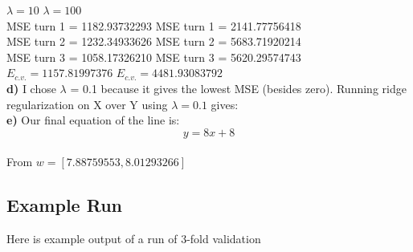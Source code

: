 \documentclass{article}
\begin{document}
 $\lambda = 10$  \hspace{20em}  $\lambda =100$ \\
MSE turn  1  =  1182.93732293  \hspace{10em} MSE turn  1  =  2141.77756418 \\
MSE turn  2  =  1232.34933626  \hspace{10em} MSE turn  2  =  5683.71920214 \\
MSE turn  3  =  1058.17326210  \hspace{10em} MSE turn  3  =  5620.29574743 \\
$E_{c.v.} =  1157.81997376$  \hspace{13em} $E_{c.v.} =  4481.93083792$ \\


\textbf{d)} I chose $\lambda$ = 0.1 because it gives the lowest MSE (besides zero). Running ridge regularization on X over Y using $\lambda = 0.1$ gives:  \\

\textbf{e)} Our final equation of the line is: $$y = 8 x  + 8$$ \\
From $w = [ 7.88759553,  8.01293266] $


\subsection*{Example Run}
Here is example output of a run of 3-fold validation
\end{document}
